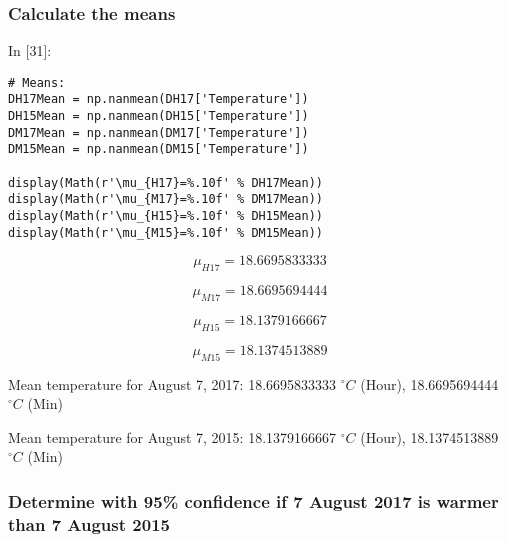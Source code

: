 \documentclass[11pt]{article}
\newif\ifcode
\newif\ifleftmargins
\newlength{\promptlength}
\newcommand{\prompt}[3]{
        \needspace{1.1cm}
        \settowidth{\promptlength}{ #1 [#3] }
        \ifleftmargins\hspace{-\promptlength}\hspace{-5pt}\fi
        {\color{#2}#1 [#3]:}
        \ifleftmargins\vspace{-2.7ex}\fi
    }
\begin{document}
    \hypertarget{calculate-the-means}{%
\subsubsection{Calculate the means}\label{calculate-the-means}}

    
\prompt{In}{incolor}{31}
\codetrue
\begin{tcolorbox}[breakable, size=fbox, boxrule=1pt, pad at break*=1mm, colback=cellbackground, colframe=cellborder]
\begin{verbatim}
# Means: 
DH17Mean = np.nanmean(DH17['Temperature'])
DH15Mean = np.nanmean(DH15['Temperature'])
DM17Mean = np.nanmean(DM17['Temperature'])
DM15Mean = np.nanmean(DM15['Temperature'])
 
display(Math(r'\mu_{H17}=%.10f' % DH17Mean)) 
display(Math(r'\mu_{M17}=%.10f' % DM17Mean))
display(Math(r'\mu_{H15}=%.10f' % DH15Mean)) 
display(Math(r'\mu_{M15}=%.10f' % DM15Mean))
\end{verbatim}
\end{tcolorbox}
\codefalse

    $$\mu_{H17}=18.6695833333$$

    
    $$\mu_{M17}=18.6695694444$$

    
    $$\mu_{H15}=18.1379166667$$

    
    $$\mu_{M15}=18.1374513889$$

    
    Mean temperature for August 7, 2017: 18.6695833333 \(^\circ C\) (Hour),
18.6695694444 \(^\circ C\) (Min)

Mean temperature for August 7, 2015: 18.1379166667 \(^\circ C\) (Hour),
18.1374513889 \(^\circ C\) (Min)

    \hypertarget{determine-with-95-confidence-if-7-august-2017-is-warmer-than-7-august-2015}{%
\subsubsection{Determine with 95\% confidence if 7 August 2017 is warmer
than 7 August
2015}\label{determine-with-95-confidence-if-7-august-2017-is-warmer-than-7-august-2015}}
\end{document}
